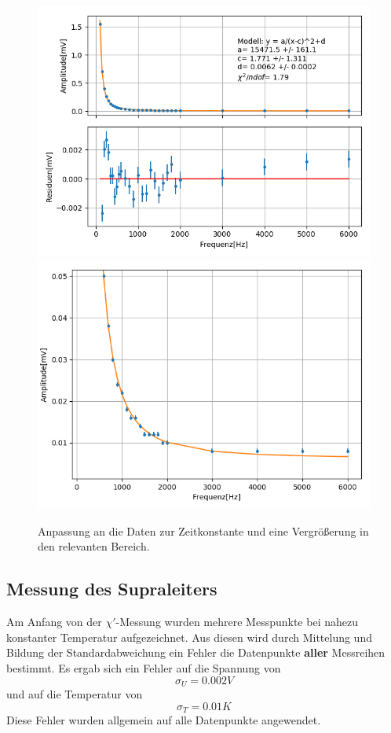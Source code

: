 \documentclass[12pt,a4paper]{article}
\begin{document}
\begin{figure}
\centering
\includegraphics[scale=0.8]{Bilder/Vorversuch4/Vor4_1.png}
\includegraphics[scale=0.8]{Bilder/Vorversuch4/Vor4_2.png}
\caption{Anpassung an die Daten zur Zeitkonstante und eine Vergrößerung in den relevanten Bereich.}
\label{fig:Vor4_anpassung}
\end{figure}

\newpage
\subsection{Messung des Supraleiters}
Am Anfang von der $\chi'$-Messung wurden mehrere Messpunkte bei nahezu konstanter Temperatur aufgezeichnet. Aus diesen wird durch Mittelung und Bildung der Standardabweichung ein Fehler die Datenpunkte \textbf{aller} Messreihen bestimmt. Es ergab sich ein Fehler auf die Spannung von
\begin{equation*}
\sigma_U = 0.002V
\end{equation*}
und auf die Temperatur von
\begin{equation*}
\sigma_T = 0.01K
\end{equation*}
Diese Fehler wurden allgemein auf alle Datenpunkte angewendet.
\end{document}
